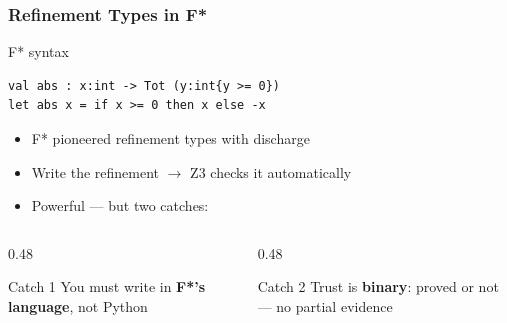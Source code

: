 \begin{frame}[fragile]
\frametitle{Refinement Types in F*}
\begin{exampleblock}{F* syntax}
\begin{lstlisting}
val abs : x:int -> Tot (y:int{y >= 0})
let abs x = if x >= 0 then x else -x
\end{lstlisting}
\end{exampleblock}
\vspace{6pt}
\begin{itemize}
  \item F* pioneered refinement types with  discharge
  \item Write the refinement $\to$ Z3 checks it automatically
  \item Powerful --- but two catches:
\end{itemize}
\vspace{6pt}
\begin{columns}[T]
\begin{column}{0.48\textwidth}
\begin{alertblock}{Catch 1}
  You must write in \textbf{F*'s language}, not Python
\end{alertblock}
\end{column}
\begin{column}{0.48\textwidth}
\begin{alertblock}{Catch 2}
  Trust is \textbf{binary}: proved or not --- no partial evidence
\end{alertblock}
\end{column}
\end{columns}
\end{frame}

